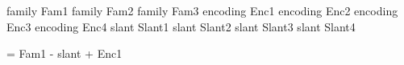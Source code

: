 


\newfontattr family     Fam1
\newfontattr family     Fam2
\newfontattr family     Fam3
\newfontattr encoding   Enc1
\newfontattr encoding   Enc2
\newfontattr encoding   Enc3
\newfontattr encoding   Enc4
\newfontattr slant      Slant1
\newfontattr slant      Slant2
\newfontattr slant      Slant3
\newfontattr slant      Slant4

\fontsubstpre   = Fam1
                - slant
                + Enc1

\bye
